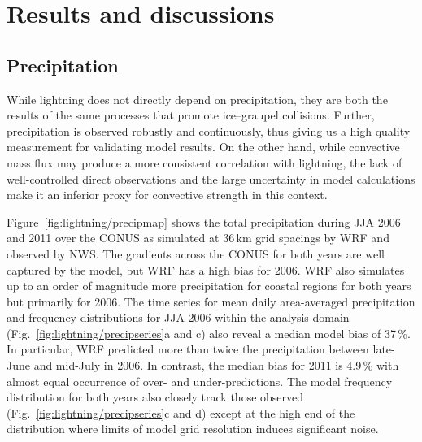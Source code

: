 \section{Results and discussions}\label{sec:lightning/results}

\subsection{Precipitation}\label{ssec:lightning/precip}

While lightning does not directly depend on precipitation, they are both the
results of the same processes that promote ice--graupel collisions. Further,
precipitation is observed robustly and continuously, thus giving us a high
quality measurement for validating model results. On the other hand, while
convective mass flux may produce a more consistent correlation with
lightning, the lack of well-controlled direct observations and the large
uncertainty in model calculations make it an inferior proxy for convective
strength in this context.

Figure~\ref{fig:lightning/precipmap} shows the total precipitation during JJA 2006 and
2011 over the CONUS as simulated at 36\,\unit{km} grid spacings by WRF and
observed by NWS. The gradients across the CONUS for both years are well
captured by the model, but WRF has a high bias for 2006. WRF also simulates
up to an order of magnitude more precipitation for coastal regions for both
years but primarily for 2006. The time series for mean daily area-averaged
precipitation and frequency distributions for JJA 2006 within the analysis
domain (Fig.~\ref{fig:lightning/precipseries}a and c) also reveal a median model bias
of 37\,{\%}. In particular, WRF predicted more than twice the precipitation
between late-June and mid-July in 2006. In contrast, the median bias for 2011
is 4.9\,{\%} with almost equal occurrence of over- and under-predictions. The
model frequency distribution for both years also closely track those observed
(Fig.~\ref{fig:lightning/precipseries}c and d) except at the high end of the
distribution where limits of model grid resolution induces significant noise.


